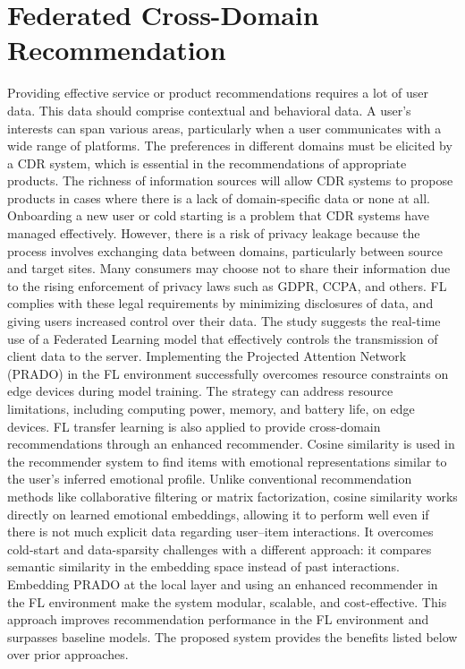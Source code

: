 \section{Federated Cross-Domain Recommendation}
Providing effective service or product recommendations requires a lot of user data. This data should comprise contextual and behavioral data. A user's interests can span various areas, particularly when a user communicates with a wide range of platforms. The preferences in different domains must be elicited by a CDR system, which is essential in the recommendations of appropriate products. The richness of information sources will allow CDR systems to propose products in cases where there is a lack of domain-specific data or none at all. Onboarding a new user or cold starting is a problem that CDR systems have managed effectively. However, there is a risk of privacy leakage because the process involves exchanging data between domains, particularly between source and target sites. Many consumers may choose not to share their information due to the rising enforcement of privacy laws such as GDPR, CCPA, and others. FL complies with these legal requirements by minimizing disclosures of data, and giving users increased control over their data. The study suggests the real-time use of a Federated Learning model that effectively controls the transmission of client data to the server. Implementing the Projected Attention Network (PRADO) in the FL environment successfully overcomes resource constraints on edge devices during model training. The strategy can address resource limitations, including computing power, memory, and battery life, on edge devices. FL transfer learning is also applied to provide cross-domain recommendations through an enhanced recommender. Cosine similarity is used in the recommender system to find items with emotional representations similar to the user's inferred emotional profile. Unlike conventional recommendation methods like collaborative filtering or matrix factorization, cosine similarity works directly on learned emotional embeddings, allowing it to perform well even if there is not much explicit data regarding user--item interactions. It overcomes cold-start and data-sparsity challenges with a different approach: it compares semantic similarity in the embedding space instead of past interactions. Embedding PRADO at the local layer and using an enhanced recommender in the FL environment make the system modular, scalable, and cost-effective. This approach improves recommendation performance in the FL environment and surpasses baseline models. The proposed system provides the benefits listed below over prior approaches.

